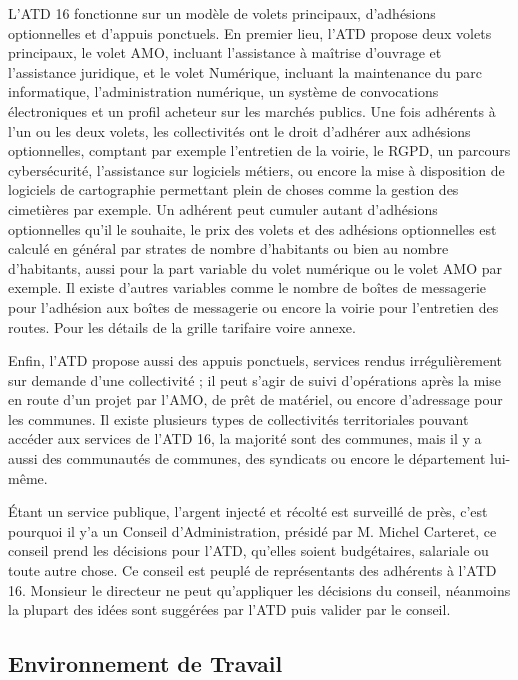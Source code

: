 \documentclass[a4paper,12pt]{report}
\begin{document}
L'ATD 16 fonctionne sur un modèle de volets principaux, d'adhésions optionnelles et d'appuis ponctuels. En premier lieu, l'ATD propose deux volets principaux, le volet AMO, incluant l'assistance à maîtrise d'ouvrage et l'assistance juridique, et le volet Numérique, incluant la maintenance du parc informatique, l'administration numérique, un système de convocations électroniques et un profil acheteur sur les marchés publics. Une fois adhérents à l'un ou les deux volets, les collectivités ont le droit d'adhérer aux adhésions optionnelles, comptant par exemple l'entretien de la voirie, le RGPD, un parcours cybersécurité, l'assistance sur logiciels métiers, ou encore la mise à disposition de logiciels de cartographie permettant plein de choses comme la gestion des cimetières par exemple. Un adhérent peut cumuler autant d'adhésions optionnelles qu'il le souhaite, le prix des volets et des adhésions optionnelles est calculé en général par strates de nombre d'habitants ou bien au nombre d'habitants, aussi pour la part variable du volet numérique ou le volet AMO par exemple. Il existe d'autres variables comme le nombre de boîtes de messagerie pour l'adhésion aux boîtes de messagerie ou encore la voirie pour l'entretien des routes. Pour les détails de la grille tarifaire voire annexe.

Enfin, l'ATD propose aussi des appuis ponctuels, services rendus irrégulièrement sur demande d'une collectivité ; il peut s'agir de suivi d'opérations après la mise en route d'un projet par l'AMO, de prêt de matériel, ou encore d'adressage pour les communes. Il existe plusieurs types de collectivités territoriales pouvant accéder aux services de l'ATD 16, la majorité sont des communes, mais il y a aussi des communautés de communes, des syndicats ou encore le département lui-même.

Étant un service publique, l'argent injecté et récolté est surveillé de près, c'est pourquoi il y'a un Conseil d'Administration, présidé par M. Michel Carteret, ce conseil prend les décisions pour l'ATD, qu'elles soient budgétaires, salariale ou toute autre chose. Ce conseil est peuplé de représentants des adhérents à l'ATD 16. Monsieur le directeur ne peut qu'appliquer les décisions du conseil, néanmoins la plupart des idées sont suggérées par l'ATD puis valider par le conseil.

\subsection{Environnement de Travail}
\end{document}
